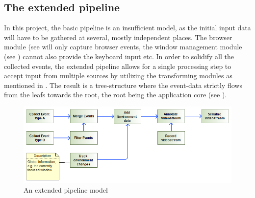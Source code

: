 \subsection{The extended pipeline}
In this project, the basic pipeline is an insufficient model, as the initial input data will have to be gathered at several, mostly independent places. The \gls{browser} module (see  will only capture \gls{browser} \glspl{event}, the window management \gls{module} (see ) cannot also provide the keyboard input etc. In order to solidify all the collected \glspl{event}, the extended pipeline allows for a single processing step to accept input from multiple sources by utilizing the transforming modules as mentioned in . The result is a tree-structure where the \gls{event}-data strictly flows from the leafs towards the root, the root being the application core (see ).
\begin{figure}[h!]
  \includegraphics[width=1.00\textwidth]{resources/extendedpipeline.png}
  \centering
  \caption{An extended pipeline model}
  \label{fig:extendedpipe}
\end{figure}

\newpage %
